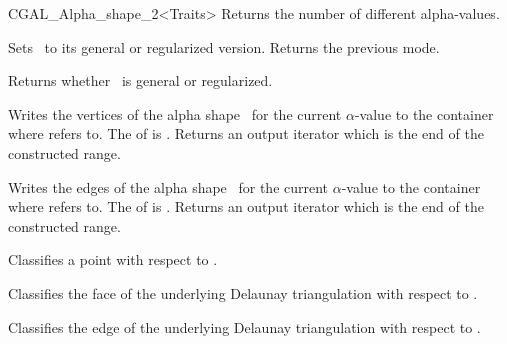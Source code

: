 \begin{ccClassTemplate} {CGAL_Alpha_shape_2<Traits>}
{Returns the number of different alpha-values.}

% 
% 
% 

{Sets \ccVar\ to its general or regularized version. 
Returns the previous mode.}

{Returns whether \ccVar\ is general or regularized.}

{Writes the vertices of the alpha shape \ccVar\ for the current $\alpha$-value
to the container where  refers to. 
The  of  is .
Returns an output iterator which is the end of the constructed range.}

{Writes the edges 
of the alpha shape \ccVar\ for the current $\alpha$-value
to the container where  refers to. 
The  of  is .
Returns an output iterator which is the end of the constructed range.}



{Classifies a point  with respect to \ccVar.}

{Classifies the face  of the underlying Delaunay triangulation with respect to \ccVar.}

{Classifies the edge  of the underlying Delaunay triangulation with respect to \ccVar.}


\end{ccClassTemplate}
